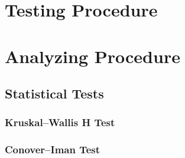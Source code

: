 \section{Testing Procedure}

\section{Analyzing Procedure}



\subsection{Statistical Tests}

\subsubsection{Kruskal–Wallis H Test}

\subsubsection{Conover–Iman Test}